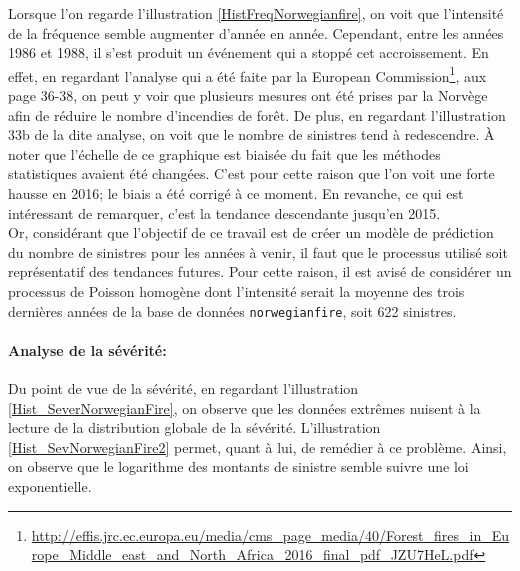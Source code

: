 			Lorsque l'on regarde l'illustration \ref{HistFreqNorwegianfire}, on voit que l'intensité de la fréquence semble augmenter d'année en année. Cependant, entre les années 1986 et 1988, il s'est produit un événement qui a stoppé cet accroissement. En effet, en regardant l'analyse qui a été faite par la European Commission\footnote{\url{http://effis.jrc.ec.europa.eu/media/cms_page_media/40/Forest_fires_in_Europe_Middle_east_and_North_Africa_2016_final_pdf_JZU7HeL.pdf}}, aux page 36-38, on peut y voir que plusieurs mesures ont été prises par la Norvège afin de réduire le nombre d'incendies de forêt. De plus, en regardant l'illustration 33b de la dite analyse, on voit que le nombre de sinistres tend à redescendre. À noter que l'échelle de ce graphique est biaisée du fait que les méthodes statistiques avaient été changées. C'est pour cette raison que l'on voit une forte hausse en 2016; le biais a été corrigé à ce moment. En revanche, ce qui est intéressant de remarquer, c'est la tendance descendante jusqu'en 2015.\\
			
			Or, considérant que l'objectif de ce travail est de créer un modèle de prédiction du nombre de sinistres pour les années à venir, il faut que le processus utilisé soit représentatif des tendances futures. Pour cette raison, il est avisé de considérer un processus de Poisson homogène dont l'intensité serait la moyenne des trois dernières années de la base de données \texttt{norwegianfire}, soit 622 sinistres.
			
			\paragraph{Analyse de la sévérité:}
			Du point de vue de la sévérité, en regardant l'illustration \ref{Hist_SeverNorwegianFire}, on observe que les données extrêmes nuisent à la lecture de la distribution globale de la sévérité. L'illustration \ref{Hist_SevNorwegianFire2} permet, quant à lui, de remédier à ce problème. Ainsi, on observe que le logarithme des montants de sinistre semble suivre une loi exponentielle.
			
